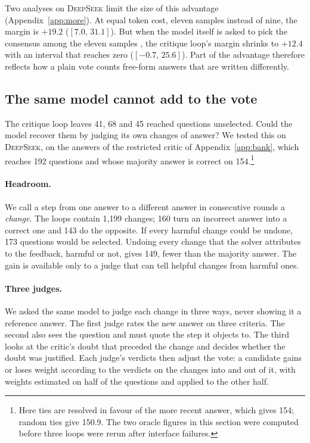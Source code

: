 \documentclass[11pt]{article}
\newcommand{\ds}{\textsc{DeepSeek}}
\newcommand{\ci}[2]{$[#1,\,#2]$}
\begin{document}
Two analyses on \ds{} limit the size of this advantage (Appendix~\ref{app:more}).
At equal token cost, eleven samples instead of nine, the margin is $+19.2$ (\ci{7.0}{31.1}).
But when the model itself is asked to pick the consensus among the eleven samples \citep{chen2023usc}, the critique loop's margin shrinks to $+12.4$ with an interval that reaches zero (\ci{-0.7}{25.6}).
Part of the advantage therefore reflects how a plain vote counts free-form answers that are written differently.

\subsection{The same model cannot add to the vote}
\label{sec:judges}

The critique loop leaves 41, 68 and 45 reached questions unselected.
Could the model recover them by judging its own changes of answer?
We tested this on \ds{}, on the answers of the restricted critic of Appendix~\ref{app:bank}, which reaches 192 questions and whose majority answer is correct on 154.\footnote{Here ties are resolved in favour of the more recent answer, which gives 154; random ties give 150.9. The two oracle figures in this section were computed before three loops were rerun after interface failures.}

\paragraph{Headroom.}
We call a step from one answer to a different answer in consecutive rounds a \emph{change}.
The loops contain 1{,}199 changes; 160 turn an incorrect answer into a correct one and 143 do the opposite.
If every harmful change could be undone, 173 questions would be selected.
Undoing every change that the solver attributes to the feedback, harmful or not, gives 149, fewer than the majority answer.
The gain is available only to a judge that can tell helpful changes from harmful ones.

\paragraph{Three judges.}
We asked the same model to judge each change in three ways, never showing it a reference answer.
The first judge rates the new answer on three criteria.
The second also sees the question and must quote the step it objects to.
The third looks at the critic's doubt that preceded the change and decides whether the doubt was justified.
Each judge's verdicts then adjust the vote: a candidate gains or loses weight according to the verdicts on the changes into and out of it, with weights estimated on half of the questions and applied to the other half.
\end{document}
